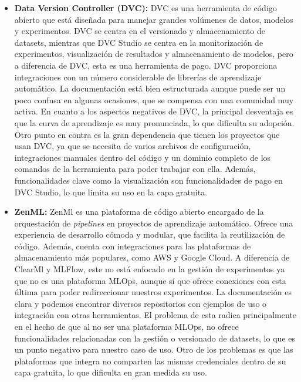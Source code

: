 \begin{itemize}
    \item \textbf{Data Version Controller (DVC):} DVC \cite{dvc} es una herramienta de código abierto que
    está diseñada para manejar grandes volúmenes de datos, modelos y experimentos. DVC
    se centra en el versionado y almacenamiento de datasets, mientras que DVC Studio se centra en la
    monitorización de experimentos, visualización de resultados y almacenamiento de modelos, pero a diferencia
    de DVC, esta es una herramienta de pago. DVC proporciona integraciones con un número considerable de librerías de 
    aprendizaje automático. La documentación está bien estructurada aunque puede ser un poco confusa en algunas ocasiones, 
    que se compensa con una comunidad muy activa. En cuanto a los aspectos negativos de DVC, la principal desventaja es que
    la curva de aprendizaje es muy pronunciada, lo que dificulta su adopción. Otro punto en contra
    es la gran dependencia que tienen los proyectos que usan DVC, ya que se necesita de varios archivos
    de configuración, integraciones manuales dentro del código y un dominio completo de los comandos de la
    herramienta para poder trabajar con ella. Además, funcionalidades clave como la visualización son funcionalidades
    de pago en DVC Studio, lo que limita su uso en la capa gratuita.
    
    \item \textbf{ZenML:} ZenMl \cite{Zenml} es una plataforma de código abierto encargado de la orquestación de \textit{pipelines} en
    proyectos de aprendizaje automático. Ofrece una experiencia de desarrollo cómoda y modular, que facilita
    la reutilización de código. Además, cuenta con integraciones para las plataformas de almacenamiento
    más populares, como AWS y Google Cloud. A diferencia de ClearMl y MLFlow, este no está enfocado en la
    gestión de experimentos ya que no es una plataforma MLOps, aunque sí que ofrece conexiones con esta última
    para poder redireccionar nuestros experimentos. La documentación es clara y podemos encontrar diversos repositorios 
    con ejemplos de uso o integración con otras herramientas. El problema de esta radica principalmente
    en el hecho de que al no ser una plataforma MLOps, no ofrece funcionalidades relacionadas con la gestión
    o versionado de datasets, lo que es un punto negativo para nuestro caso de uso. Otro de los problemas
    es que las plataformas que integra no comparten las mismas credenciales dentro de su capa
    gratuita, lo que dificulta en gran medida su uso. 


\end{itemize}
